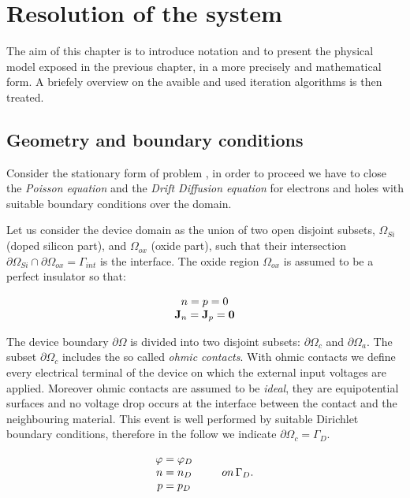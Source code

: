 \chapter{Resolution of the system}

The aim of this chapter is to introduce notation and to present the physical model exposed in the previous chapter, in a more precisely and mathematical form. A briefely overview on the avaible and used iteration algorithms is then treated.

\section{Geometry and boundary conditions}

Consider the stationary form of problem , in order to proceed we have to close the \textit{Poisson equation} and the \textit{Drift Diffusion equation} for electrons and holes with suitable boundary conditions over the domain.

Let us consider the device domain as the union of two open disjoint subsets, $\Omega_{Si}$ (doped silicon part), and $\Omega_{ox}$ (oxide part), such that their intersection $\partial \Omega_{Si} \cap \partial \Omega_{ox} = \Gamma_{int}$ is the interface. The oxide region $\Omega_{ox}$ is assumed to be a perfect insulator so that:

\begin{equation}
\label{eq: hypotesis oxide}
\begin{array}{c}
n = p = 0 \\
\mathbf{J}_n = \mathbf{J}_p = \mathbf{0}

\end{array}
\end{equation}

The device boundary $\partial \Omega$ is divided into two disjoint subsets: $\partial \Omega_{c}$ and $\partial \Omega_{a}$.
The subset $\partial \Omega_{c}$ includes the so called \textit{ohmic contacts}. With ohmic contacts we define every electrical terminal of the device on which the external input voltages are applied. Moreover ohmic contacts are assumed to be \textit{ideal}, they are equipotential surfaces and no voltage drop occurs at the interface between the contact and the neighbouring material. This event is well performed by suitable Dirichlet boundary conditions, therefore in the follow we indicate $\partial \Omega_{c} = \Gamma_D$.

\begin{equation}
\label{eq: dirichlet boundary condition}
\begin{array}{cc}
\varphi = \varphi_D & \\
n = n_D & \psp{10} on \, \Gamma_D .\\
p = p_D & 
\end{array}
\end{equation}

